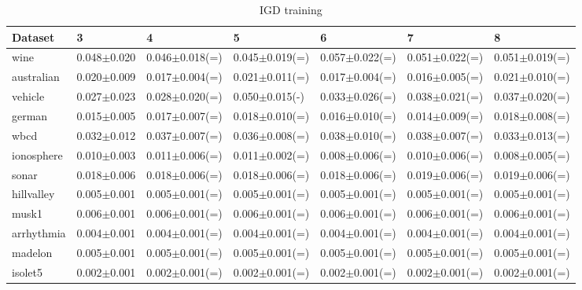 \documentclass{report}
\begin{document}
\begin{table}
\centering
\scriptsize
\begin{tabular}{lllllll}
\\\hline
Dataset & 3 & 4 & 5 & 6 & 7 & 8\\\hline
wine & 0.048$\pm$0.020 & 0.046$\pm$0.018(=) & 0.045$\pm$0.019(=) & 0.057$\pm$0.022(=) & 0.051$\pm$0.022(=) & 0.051$\pm$0.019(=)\\\hline
australian & 0.020$\pm$0.009 & 0.017$\pm$0.004(=) & 0.021$\pm$0.011(=) & 0.017$\pm$0.004(=) & 0.016$\pm$0.005(=) & 0.021$\pm$0.010(=)\\\hline
vehicle & 0.027$\pm$0.023 & 0.028$\pm$0.020(=) & 0.050$\pm$0.015(-) & 0.033$\pm$0.026(=) & 0.038$\pm$0.021(=) & 0.037$\pm$0.020(=)\\\hline
german & 0.015$\pm$0.005 & 0.017$\pm$0.007(=) & 0.018$\pm$0.010(=) & 0.016$\pm$0.010(=) & 0.014$\pm$0.009(=) & 0.018$\pm$0.008(=)\\\hline
wbcd & 0.032$\pm$0.012 & 0.037$\pm$0.007(=) & 0.036$\pm$0.008(=) & 0.038$\pm$0.010(=) & 0.038$\pm$0.007(=) & 0.033$\pm$0.013(=)\\\hline
ionosphere & 0.010$\pm$0.003 & 0.011$\pm$0.006(=) & 0.011$\pm$0.002(=) & 0.008$\pm$0.006(=) & 0.010$\pm$0.006(=) & 0.008$\pm$0.005(=)\\\hline
sonar & 0.018$\pm$0.006 & 0.018$\pm$0.006(=) & 0.018$\pm$0.006(=) & 0.018$\pm$0.006(=) & 0.019$\pm$0.006(=) & 0.019$\pm$0.006(=)\\\hline
hillvalley & 0.005$\pm$0.001 & 0.005$\pm$0.001(=) & 0.005$\pm$0.001(=) & 0.005$\pm$0.001(=) & 0.005$\pm$0.001(=) & 0.005$\pm$0.001(=)\\\hline
musk1 & 0.006$\pm$0.001 & 0.006$\pm$0.001(=) & 0.006$\pm$0.001(=) & 0.006$\pm$0.001(=) & 0.006$\pm$0.001(=) & 0.006$\pm$0.001(=)\\\hline
arrhythmia & 0.004$\pm$0.001 & 0.004$\pm$0.001(=) & 0.004$\pm$0.001(=) & 0.004$\pm$0.001(=) & 0.004$\pm$0.001(=) & 0.004$\pm$0.001(=)\\\hline
madelon & 0.005$\pm$0.001 & 0.005$\pm$0.001(=) & 0.005$\pm$0.001(=) & 0.005$\pm$0.001(=) & 0.005$\pm$0.001(=) & 0.005$\pm$0.001(=)\\\hline
isolet5 & 0.002$\pm$0.001 & 0.002$\pm$0.001(=) & 0.002$\pm$0.001(=) & 0.002$\pm$0.001(=) & 0.002$\pm$0.001(=) & 0.002$\pm$0.001(=)\\\hline
\end{tabular}
\caption{IGD training}
\end{table}
\end{document}
